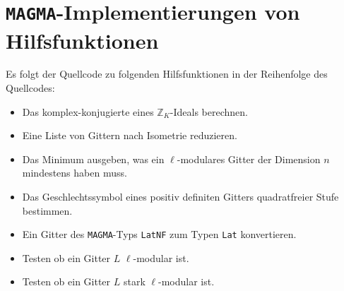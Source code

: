 \documentclass[12pt,a4paper,halfparskip,headsepline,bibtotocnumbered]{scrreprt}
\theoremstyle{nummermitklammern}
\theoremstyle{nonumberbreak}
\newcommand{\Z}{\mathbb{Z}}
\begin{document}
\section{\texttt{MAGMA}-Implementierungen von Hilfsfunktionen}
Es folgt der Quellcode zu folgenden Hilfsfunktionen in der Reihenfolge des Quellcodes:
\begin{itemize}
	\item Das komplex-konjugierte eines $\Z_K$-Ideals berechnen.
	\item Eine Liste von Gittern nach Isometrie reduzieren.
	\item Das Minimum ausgeben, was ein $\ell$-modulares Gitter der Dimension $n$ mindestens haben muss.
	\item Das Geschlechtssymbol eines positiv definiten Gitters quadratfreier Stufe bestimmen.
	\item Ein Gitter des \texttt{MAGMA}-Typs \texttt{LatNF} zum Typen \texttt{Lat} konvertieren.
	\item Testen ob ein Gitter $L$ $\ell$-modular ist.
	\item Testen ob ein Gitter $L$ stark $\ell$-modular ist.
\end{itemize}

\end{document}
